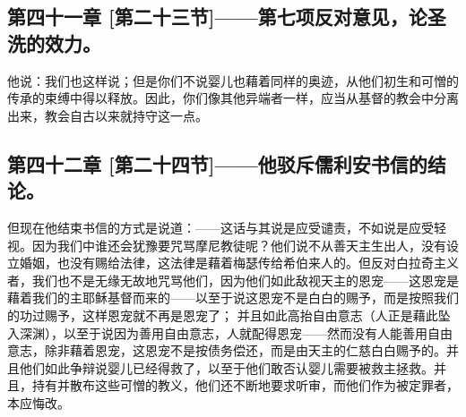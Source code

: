 \subsection{第四十一章 [第二十三节]——第七项反对意见，论圣洗的效力。}

他说：我们也这样说；但是你们不说婴儿也藉着同样的奥迹，从他们初生和可憎的传承的束缚中得以释放。因此，你们像其他异端者一样，应当从基督的教会中分离出来，教会自古以来就持守这一点。\par


\subsection{第四十二章 [第二十四节]——他驳斥儒利安书信的结论。}

但现在他结束书信的方式是说道：——这话与其说是应受谴责，不如说是应受轻视。因为我们中谁还会犹豫要咒骂摩尼教徒呢？他们说不从善天主生出人，没有设立婚姻，也没有赐给法律，这法律是藉着梅瑟传给希伯来人的。但反对白拉奇主义者，我们也不是无缘无故地咒骂他们，因为他们如此敌视天主的恩宠——这恩宠是藉着我们的主耶稣基督而来的——以至于说这恩宠不是白白的赐予，而是按照我们的功过赐予，这样恩宠就不再是恩宠了； 并且如此高抬自由意志（人正是藉此坠入深渊），以至于说因为善用自由意志，人就配得恩宠——然而没有人能善用自由意志，除非藉着恩宠，这恩宠不是按债务偿还，而是由天主的仁慈白白赐予的。并且他们如此争辩说婴儿已经得救了，以至于他们敢否认婴儿需要被救主拯救。并且，持有并散布这些可憎的教义，他们还不断地要求听审，而他们作为被定罪者，本应悔改。\par



\section{}

